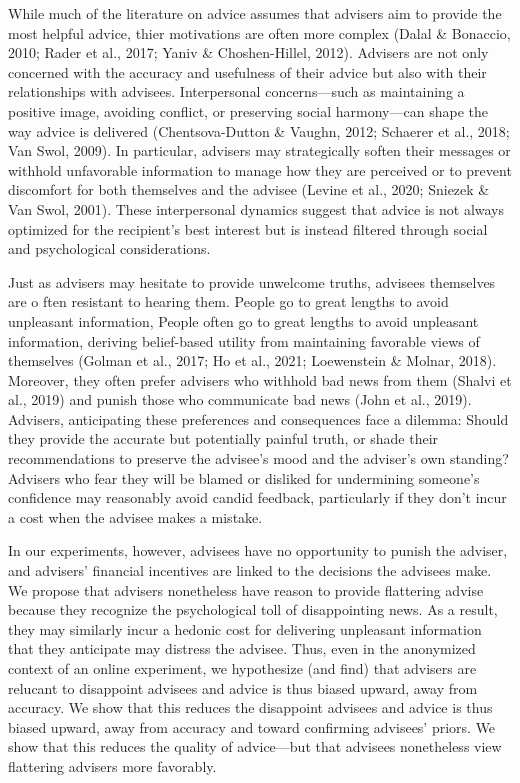 \documentclass[
  man,
  floatsintext,
  longtable,
  nolmodern,
  notxfonts,
  notimes,
  colorlinks=true,linkcolor=blue,citecolor=blue,urlcolor=blue]{apa7}
\begin{document}
While much of the literature on advice assumes that advisers aim to
provide the most helpful advice, thier motivations are often more
complex (Dalal \& Bonaccio, 2010; Rader et al., 2017; Yaniv \&
Choshen-Hillel, 2012). Advisers are not only concerned with the accuracy
and usefulness of their advice but also with their relationships with
advisees. Interpersonal concerns---such as maintaining a positive image,
avoiding conflict, or preserving social harmony---can shape the way
advice is delivered (Chentsova-Dutton \& Vaughn, 2012; Schaerer et al.,
2018; Van Swol, 2009). In particular, advisers may strategically soften
their messages or withhold unfavorable information to manage how they
are perceived or to prevent discomfort for both themselves and the
advisee (Levine et al., 2020; Sniezek \& Van Swol, 2001). These
interpersonal dynamics suggest that advice is not always optimized for
the recipient's best interest but is instead filtered through social and
psychological considerations.

Just as advisers may hesitate to provide unwelcome truths, advisees
themselves are o ften resistant to hearing them. People go to great
lengths to avoid unpleasant information, People often go to great
lengths to avoid unpleasant information, deriving belief-based utility
from maintaining favorable views of themselves (Golman et al., 2017; Ho
et al., 2021; Loewenstein \& Molnar, 2018). Moreover, they often prefer
advisers who withhold bad news from them (Shalvi et al., 2019) and
punish those who communicate bad news (John et al., 2019). Advisers,
anticipating these preferences and consequences face a dilemma: Should
they provide the accurate but potentially painful truth, or shade their
recommendations to preserve the advisee's mood and the adviser's own
standing? Advisers who fear they will be blamed or disliked for
undermining someone's confidence may reasonably avoid candid feedback,
particularly if they don't incur a cost when the advisee makes a
mistake.

In our experiments, however, advisees have no opportunity to punish the
adviser, and advisers' financial incentives are linked to the decisions
the advisees make. We propose that advisers nonetheless have reason to
provide flattering advise because they recognize the psychological toll
of disappointing news. As a result, they may similarly incur a hedonic
cost for delivering unpleasant information that they anticipate may
distress the advisee. Thus, even in the anonymized context of an online
experiment, we hypothesize (and find) that advisers are relucant to
disappoint advisees and advice is thus biased upward, away from
accuracy. We show that this reduces the disappoint advisees and advice
is thus biased upward, away from accuracy and toward confirming
advisees' priors. We show that this reduces the quality of advice---but
that advisees nonetheless view flattering advisers more favorably.
\end{document}
